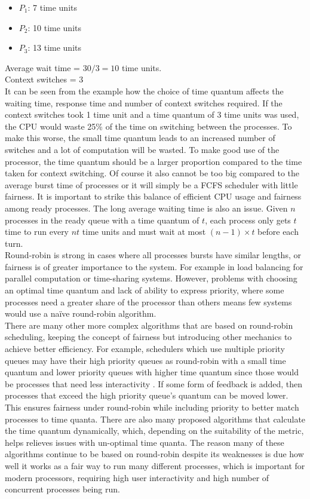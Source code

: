 \documentclass{article}
\newcommand{\n}[0]{\\[\baselineskip]}
\begin{document}
\begin{itemize}
\item $P_{1}$: 7 time units
\item $P_{2}$: 10 time units
\item $P_{3}$: 13 time units
\end{itemize}
\noindent Average wait time = $30 / 3 = 10$ time units.
\\ Context switches = 3
\n
It can be seen from the example how the choice of time quantum affects the waiting time, response time and number of context switches required. If the context switches took 1 time unit and a time quantum of 3 time units was used, the CPU would waste 25\% of the time on switching between the processes. To make this worse, the small time quantum leads to an increased number of switches and a lot of computation will be wasted. To make good use of the processor, the time quantum should be a larger proportion compared to the time taken for context switching. Of course it also cannot be too big compared to the average burst time of processes or it will simply be a FCFS scheduler with little fairness. It is important to strike this balance of efficient CPU usage and fairness among ready processes. The long average waiting time is also an issue. Given $n$ processes in the ready queue with a time quantum of $t$, each process only gets $t$ time to run every $nt$ time units and must wait at most $(n - 1) \times t$ before each turn. 
\n
Round-robin is strong in cases where all processes bursts have similar lengths, or fairness is of greater importance to the system. For example in load balancing for parallel computation or time-sharing systems. However, problems with choosing an optimal time quantum and lack of ability to express priority, where some processes need a greater share of the processor than others means few systems would use a na\"{i}ve round-robin algorithm.
\n
There are many other more complex algorithms that are based on round-robin scheduling, keeping the concept of fairness but introducing other mechanics to achieve better efficiency. For example, schedulers which use multiple priority queues may have their high priority queues as round-robin with a small time quantum and lower priority queues with higher time quantum since those would be processes that need less interactivity \cite{os}. If some form of feedback is added, then processes that exceed the high priority queue's quantum can be moved lower. This ensures fairness under round-robin while including priority to better match processes to time quanta. There are also many proposed algorithms that calculate the time quantum dynamically, which, depending on the suitability of the metric, helps relieves issues with un-optimal time quanta. The reason many of these algorithms continue to be based on round-robin despite its weaknesses is due how well it works as a fair way to run many different processes, which is important for modern processors, requiring high user interactivity and high number of concurrent processes being run. 
\end{document}
